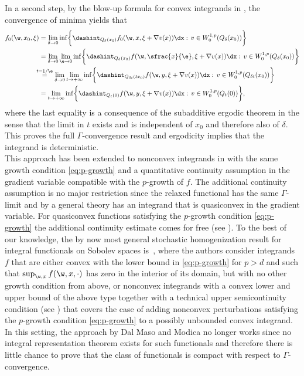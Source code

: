 In a second step, by the blow-up formula for convex integrands in \cite[Th.\,1]{DM2}, the convergence of minima yields that
\begin{align*}
f_{0}(\w,x_0,\xi)&=\lim_{\delta\to 0}\inf\biggl\{\dashint_{Q_{\delta}(x_0)}f_0(\w,x,\xi+\nabla v(x))\dx:\,v\in W^{1,p}_0(Q_{\delta}(x_0))\biggr\}
\\
&=\lim_{\delta\to 0}\lim_{\e\to 0}\inf\biggl\{\dashint_{Q_{\delta}(x_0)}f(\w,\sfrac{x}{\e},\xi+\nabla v(x))\dx:\,v\in W^{1,p}_0(Q_{\delta}(x_0))\biggr\}
\\
&\!\!\!\!\overset{t=1/\e}{=}\lim_{\delta\to 0}\lim_{t\to +\infty}\inf\biggl\{\dashint_{Q_{\delta t}(tx_0)}f(\w,y,\xi+\nabla v(x))\dx:\,v\in W^{1,p}_0(Q_{\delta t}(x_0))\biggr\}
\\
&=\lim_{t\to +\infty}\inf\biggl\{\dashint_{Q_{ t}(0)}f(\w,y,\xi+\nabla v(x))\dx:\,v\in W^{1,p}_0(Q_{t}(0))\biggr\},
\end{align*}
where the last equality is a consequence of the subadditive ergodic theorem \cite{AkKr} in the sense that the limit in $t$ exists and is independent of $x_0$ and therefore also of $\delta$. This proves the full $\Gamma$-convergence result and ergodicity implies that the integrand is deterministic.
\\
This approach has been extended to nonconvex integrands in \cite{MeMi} with the same growth condition \eqref{eq:p-growth} and a quantitative continuity assumption in the gradient variable compatible with the $p$-growth of $f$. The additional continuity assumption is no major restriction since the relaxed functional has the same $\Gamma$-limit and by a general theory has an integrand that is quasiconvex in the gradient variable. For quasiconvex functions satisfying the $p$-growth condition \eqref{eq:p-growth} the additional continuity estimate comes for free (see \cite[Prop.\,4.64]{FoLe}). To the best of our knowledge, the by now most general stochastic homogenization result for integral functionals on Sobolev spaces is~\cite{DG_unbounded}, where the authors consider integrands $f$ that are either convex with the lower bound in \eqref{eq:p-growth} for $p>d$ and such that $\sup_{\w,x}f(\w,x,\cdot)$ has zero in the interior of its domain, but with no other growth condition from above, or nonconvex integrands with a convex lower and upper bound of the above type together with a technical upper semicontinuity condition (see \cite[Def.\,2.5]{DG_unbounded}) that covers the case of adding nonconvex perturbations satisfying the $p$-growth condition \eqref{eq:p-growth} to a possibly unbounded convex integrand. In this setting, the approach by Dal Maso and Modica no longer works since no integral representation theorem exists for such functionals and therefore there is little chance to prove that the class of functionals is compact with respect to $\Gamma$-convergence.

